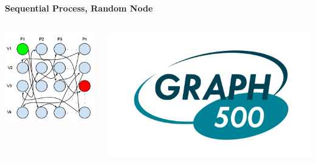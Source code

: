 \documentclass[final]{beamer}
\begin{document}
\begin{frame}[t]
\begin{columns}[t]
\begin{column}{0.60\paperwidth}
\begin{columns}[t,totalwidth=0.60\paperwidth]
\begin{column}{0.28\paperwidth}
						\begin{center} \bf{Sequential Process, Random Node} \end{center}
						\begin{columns}[t,totalwidth=0.28\paperwidth]
							\begin{column}{0.12\paperwidth}
								\begin{center} \includegraphics[width=0.12\paperwidth]{img/linked_list/seq_proc_rand_node} \end{center}
							\end{column}
							\begin{column}{0.12\paperwidth}
								\begin{center} \includegraphics[width=0.12\paperwidth]{img/logo_graph500} \end{center}

\end{column}
\end{columns}
\end{column}
\end{columns}
\end{column}
\end{columns}
\end{frame}
\end{document}
